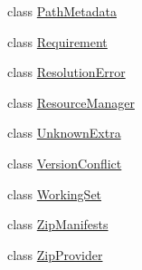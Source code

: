 \begin{DoxyCompactItemize}
\item 
class \hyperlink{classpkg__resources_1_1PathMetadata}{Path\+Metadata}
\item 
class \hyperlink{classpkg__resources_1_1Requirement}{Requirement}
\item 
class \hyperlink{classpkg__resources_1_1ResolutionError}{Resolution\+Error}
\item 
class \hyperlink{classpkg__resources_1_1ResourceManager}{Resource\+Manager}
\item 
class \hyperlink{classpkg__resources_1_1UnknownExtra}{Unknown\+Extra}
\item 
class \hyperlink{classpkg__resources_1_1VersionConflict}{Version\+Conflict}
\item 
class \hyperlink{classpkg__resources_1_1WorkingSet}{Working\+Set}
\item 
class \hyperlink{classpkg__resources_1_1ZipManifests}{Zip\+Manifests}
\item 
class \hyperlink{classpkg__resources_1_1ZipProvider}{Zip\+Provider}
\end{DoxyCompactItemize}
